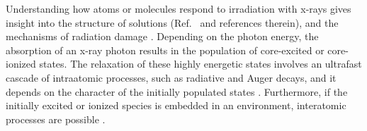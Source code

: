Understanding how atoms or molecules respond to irradiation with x-rays gives insight into the
structure of solutions (Ref.\ \citep{smith17:13909} and references therein), and the mechanisms
of radiation damage \citep{ONeill02:329,Carugo05:213,Stumpf16:237}. Depending on the photon
energy, the absorption of an x-ray photon results in the population of core-excited or core-ionized
states. The relaxation of these highly energetic states involves an ultrafast cascade of
intraatomic processes, such as radiative and Auger decays, and it depends on the character
of the initially populated states
\citep{stoychev08:074307,Demekhin08:043421,Demekhin09:104303,Ouchi11:053415,
Miteva14:164303,travnikova16:213001,Gokhberg14:661,Trinter14:664}. Furthermore,
if the initially excited or ionized species is embedded in an environment,
interatomic processes are possible  \citep{Pokapanich09:7264,Pokapanich11:13430,
Stumpf16:237,unger17:708,ceolin17:263003}.




